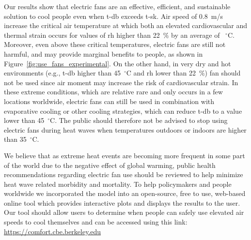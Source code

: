 Our results show that electric fans are an effective, efficient, and sustainable solution to cool people even when \ac{t-db} exceeds \ac{t-sk}.
Air speed of 0.8~m/s increase the critical air temperature at which both an elevated cardiovascular and thermal strain occurs for values of \ac{rh} higher than 22~\% by an average of ~$^{\circ}$C\@.
Moreover, even above these critical temperatures, electric fans are still not harmful, and may provide marginal benefits to people, as shown in Figure~\ref{fig:use_fans_experimental}.
On the other hand, in very dry and hot environments (e.g., \ac{t-db} higher than 45~$^{\circ}$C and \ac{rh} lower than 22~\%) fan should not be used since air moment may increase the risk of cardiovascular strain.
In these extreme conditions, which are relative rare and only occurs in a few locations worldwide, electric fans can still be used in combination with evaporative cooling or other cooling strategies, which can reduce \ac{t-db} to a value lower than 45~$^{\circ}$C\@.
The public should therefore not be advised to stop using electric fans during  heat waves when temperatures outdoors or indoors are higher than 35~$^{\circ}$C\@.

We believe that as extreme heat events are becoming more frequent in some part of the world due to the negative effect of global warming, public health recommendations regarding electric fan use should be reviewed to help minimize heat wave related morbidity and mortality. 
To help policymakers and people worldwide we incorporated the model into an open-source, free to use, web-based online tool which provides interactive plots and displays the results to the user.
Our tool should allow users to determine when people can safely use elevated air speeds to cool themselves and can be accessed using this link: \url{https://comfort.cbe.berkeley.edu}